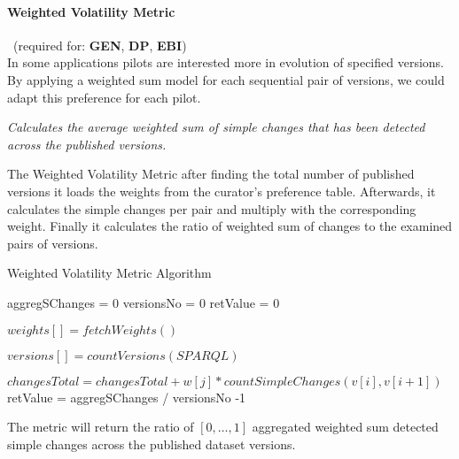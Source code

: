 \paragraph{Weighted Volatility Metric}~(required for: \textbf{GEN}, \textbf{DP}, \textbf{EBI})~\\ %
In some applications pilots are interested more in evolution of specified versions. By applying a weighted sum model \cite{WSM} for each sequential pair of versions, we could adapt this preference for each pilot.

\begin{mdframed}[style=metricdefinition]
\emph{Calculates the average weighted sum of simple changes that has been detected across the published versions.}
\end{mdframed}

The Weighted Volatility Metric after finding the total number of published versions it loads the weights
from the curator's preference table. Afterwards, it calculates the simple changes per pair and multiply with the corresponding weight. Finally it calculates the ratio of weighted sum of changes to the examined pairs of versions.


\begin{algorithm}
\caption{Weighted Volatility Metric Algorithm}
\begin{algorithmic}[1]

\State aggregSChanges = 0
\State versionsNo = 0
\State retValue = 0
\EndProcedure

\State $ weights [] = fetchWeights()$
\EndProcedure

\State $ versions [] = countVersions (SPARQL)$

\State $changesTotal = changesTotal + w[j]*countSimpleChanges(v[i],v[i+1])$
	\EndFor
\EndFor
\EndProcedure
\State retValue = aggregSChanges / versionsNo -1
\State {}
\end{algorithmic}
\end{algorithm}

The metric will return the ratio of $[0,\ldots,1]$ aggregated weighted sum detected simple changes across the published dataset versions.

